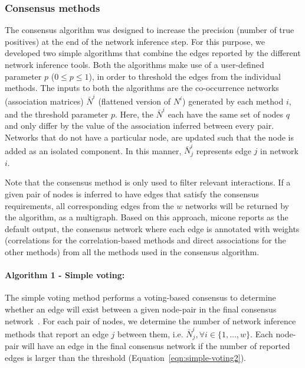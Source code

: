   \subsubsection*{Consensus methods}
  \vspace{-5mm}
  The consensus algorithm was designed to increase the precision (number of true positives) at the end of the network inference step.
  For this purpose, we developed two simple algorithms that combine the edges reported by the different network inference tools.
  Both the algorithms make use of a user-defined parameter $p$ ($0 \leq p \leq 1$), in order to threshold the edges from the individual methods.
  The inputs to both the algorithms are the co-occurrence networks (association matrices) $\bar{N}^i$ (flattened version of $N^{i}$) generated by each method $i$, and the threshold parameter $p$.
  Here, the $\bar{N}^{i}$ each have the same set of nodes $q$ and only differ by the value of the association inferred between every pair.
  Networks that do not have a particular node, are updated such that the node is added as an isolated component.
  In this manner, $\bar{N}^{i}_j$ represents edge $j$ in network $i$.

    Note that the consensus method is only used to filter relevant interactions.
    If a given pair of nodes is inferred to have edges that satisfy the consensus requirements, all corresponding edges from the $w$ networks will be returned by the algorithm, as a multigraph.
    Based on this approach, \ac{micone} reports as the default output, the consensus network where each edge is annotated with weights (correlations for the correlation-based methods and direct associations for the other methods) from all the methods used in the consensus algorithm.

  \paragraph*{Algorithm 1 - Simple voting:}
  The simple voting method performs a voting-based consensus to determine whether an edge will exist between a given node-pair in the final consensus network~\cite{bustinceFuzzySetsTheir2008,tsarevApplicationMajorityVoting2018}.
  For each pair of nodes, we determine the number of network inference methods that report an edge $j$ between them, i.e. $\bar{N}^{i}_{j}, \forall i \in \{1,\dots,w\}$.
  Each node-pair will have an edge in the final consensus network if the number of reported edges is larger than the threshold (Equation~\ref{eqn:simple-voting2}).

